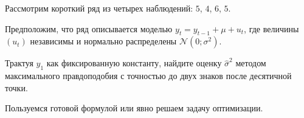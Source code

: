 
\begin{question}
Рассмотрим короткий ряд из четырех наблюдений: \(5\), \(4\), \(6\), \(5\).

Предположим, что ряд описывается моделью \(y_t = y_{t-1} + \mu + u_t\), где величины \((u_t)\) независимы
и нормально распределены \(\mathcal{N}(0;\sigma^2)\).

Трактуя \(y_1\) как фиксированную константу, найдите оценку \(\hat\sigma^2\) методом максимального правдоподобия с точностью до двух знаков после десятичной точки.
\end{question}

\begin{solution}
Пользуемся готовой формулой или явно решаем задачу оптимизации.
\end{solution}

